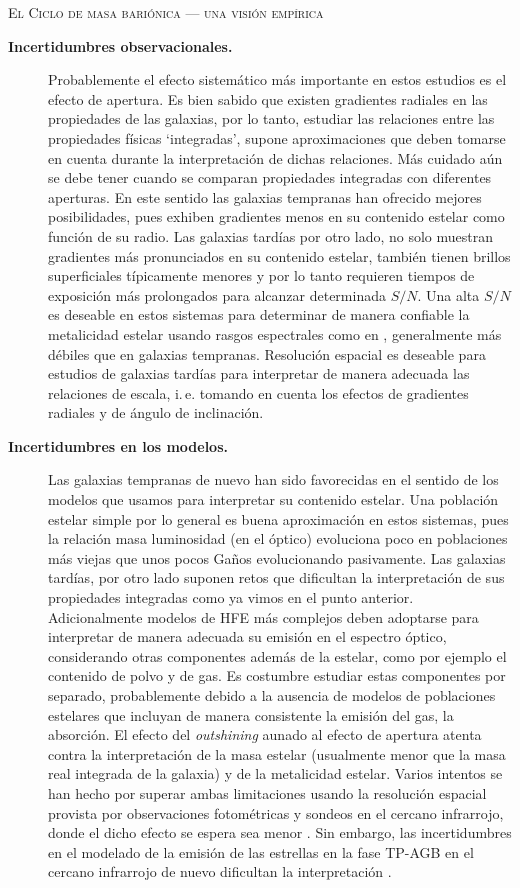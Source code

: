 \documentclass[xcolor=dvipsnames,4pt,hyperref={colorlinks,citecolor=black,linkcolor=black,urlcolor=black}]{beamer}
\begin{document}
\begin{frame}[allowframebreaks]{\textsc{El Ciclo de masa bariónica --- una visión empírica}}
\begin{description}
%
\item[\textbf{Incertidumbres observacionales.}] Probablemente el efecto sistemático más importante
en estos estudios es el efecto de apertura. Es bien sabido que existen gradientes radiales en las
propiedades de las galaxias, por lo tanto, estudiar las relaciones entre las propiedades físicas
`integradas', supone aproximaciones que deben tomarse en cuenta durante la interpretación de dichas
relaciones.
Más cuidado aún se debe tener cuando se comparan propiedades integradas con diferentes aperturas. En
este sentido las galaxias tempranas han ofrecido mejores posibilidades, pues exhiben gradientes
menos en su contenido estelar como función de su radio. Las galaxias tardías por otro lado, no solo
muestran gradientes más pronunciados en su contenido estelar, también tienen brillos superficiales
típicamente menores y por lo tanto requieren tiempos de exposición más prolongados para alcanzar
determinada $S/N$. Una alta $S/N$ es deseable en estos sistemas para determinar de manera confiable
la metalicidad estelar usando rasgos espectrales como en \citet{Gallazzi2005}, generalmente más
débiles que en galaxias tempranas. Resolución espacial es deseable para estudios de galaxias tardías
para interpretar de manera adecuada las relaciones de escala, i.\,e. tomando en cuenta los efectos
de gradientes radiales y de ángulo de inclinación.
%
\item[\textbf{Incertidumbres en los modelos.}] Las galaxias tempranas de nuevo han sido favorecidas
en el sentido de los modelos que usamos para interpretar su contenido estelar. Una población estelar
simple por lo general es buena aproximación en estos sistemas, pues la relación masa luminosidad (en
el óptico) evoluciona poco en poblaciones más viejas que unos pocos Gaños evolucionando pasivamente.
Las galaxias tardías, por otro lado suponen retos que dificultan la interpretación de sus
propiedades integradas como ya vimos en el punto anterior. Adicionalmente modelos de HFE más
complejos deben adoptarse para interpretar de manera adecuada su emisión en el espectro óptico,
considerando otras componentes además de la estelar, como por ejemplo el contenido de polvo y de
gas. Es costumbre estudiar estas componentes por separado, probablemente debido a la ausencia de
modelos de poblaciones estelares que incluyan de manera consistente la emisión del gas, la
absorción. El efecto del \emph{outshining} aunado al efecto de apertura atenta contra la
interpretación de la masa estelar (usualmente menor que la masa real integrada de la galaxia) y de
la metalicidad estelar. Varios intentos se han hecho por superar ambas limitaciones usando la
resolución espacial provista por observaciones fotométricas \citep{Sorba2015} y sondeos en el
cercano infrarrojo, donde el dicho efecto se espera sea menor \citep{Eminian2008}. Sin embargo, las
incertidumbres en el modelado de la emisión de las estrellas en la fase TP-AGB en el cercano
infrarrojo de nuevo dificultan la interpretación \citep{Zibetti2013}.
%
\end{description}


\end{frame}
\end{document}
